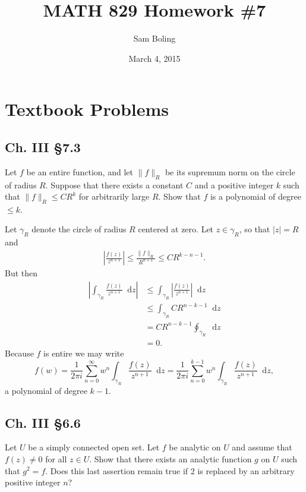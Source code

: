\documentclass{article}
\title{MATH 829 Homework \#7}
\date{March 4, 2015}
\author{Sam Boling}
\newcommand\dif{\mathop{}\!\mathrm{d}}
\newcommand\horline{\noindent\makebox[\linewidth]{\rule{\textwidth}{0.4pt}}}
\newcounter{Problem}
\begin{document}
\begin{titlepage}
\maketitle
\end{titlepage}

\section{Textbook Problems}
\subsection*{Ch. III \S 7.3}
Let $f$ be an entire function, and let $\|f\|_R$ be its supremum
norm on the circle of radius $R$. Suppose that there exists a
constant $C$ and a positive integer $k$ such that
$\|f\|_R \leq C R^k$ for arbitrarily large $R$. Show that $f$ is a
polynomial of degree $\leq k$.

\horline

Let $\gamma_R$ denote the circle of radius $R$ centered at zero.
Let $z \in \gamma_R$, so that $|z| = R$ and
\begin{align*}
     \left|
       \frac{f(z)}{z^{n+1}}
     \right|
\leq \frac{\|f\|_{R}}{R^{n+1}}
\leq C R^{k - n - 1}.
\end{align*}
But then
\begin{align*}
       \left|
         \int_{\gamma_R}
           \frac{f(z)}{z^{n+1}}
           \dif z
       \right|
& \leq \int_{\gamma_R}
       \left|
         \frac{f(z)}{z^{n+1}}
       \right|
       \dif z \\
& \leq \int_{\gamma_R}
         C R^{n-k-1}
         \dif z \\
& =    C R^{n - k - 1}
       \oint_{\gamma_R}
         \dif z \\
& =    0.
\end{align*}
Because $f$ is entire we may write
$$
  f(w)
= \frac{1}{2 \pi i}
  \sum_{n=0}^\infty
    w^n
    \int_{\gamma_R}
      \frac{f(z)}{z^{n+1}}
      \dif z
= \frac{1}{2 \pi i}
  \sum_{n=0}^{k-1}
    w^n
    \int_{\gamma_R}
      \frac{f(z)}{z^{n+1}}
      \dif z,
$$
a polynomial of degree $k-1$.


\subsection*{Ch. III \S 6.6}
Let $U$ be a simply connected open set. Let $f$ be analytic on
$U$ and assume that $f(z) \neq 0$ for all $z \in U$. Show that there
exists an analytic function $g$ on $U$ such that $g^2 = f$. Does this
last assertion remain true if 2 is replaced by an arbitrary positive
integer $n$?
\end{document}
